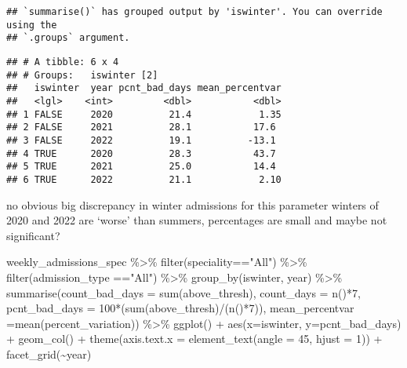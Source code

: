 \documentclass[
]{article}
\newenvironment{Shaded}{\begin{snugshade}}{\end{snugshade}}
\newcommand{\AttributeTok}[1]{\textcolor[rgb]{0.77,0.63,0.00}{#1}}
\newcommand{\DecValTok}[1]{\textcolor[rgb]{0.00,0.00,0.81}{#1}}
\newcommand{\FunctionTok}[1]{\textcolor[rgb]{0.00,0.00,0.00}{#1}}
\newcommand{\NormalTok}[1]{#1}
\newcommand{\SpecialCharTok}[1]{\textcolor[rgb]{0.00,0.00,0.00}{#1}}
\newcommand{\StringTok}[1]{\textcolor[rgb]{0.31,0.60,0.02}{#1}}
\begin{document}
\begin{verbatim}
## `summarise()` has grouped output by 'iswinter'. You can override using the
## `.groups` argument.
\end{verbatim}

\begin{verbatim}
## # A tibble: 6 x 4
## # Groups:   iswinter [2]
##   iswinter  year pcnt_bad_days mean_percentvar
##   <lgl>    <int>         <dbl>           <dbl>
## 1 FALSE     2020          21.4            1.35
## 2 FALSE     2021          28.1           17.6 
## 3 FALSE     2022          19.1          -13.1 
## 4 TRUE      2020          28.3           43.7 
## 5 TRUE      2021          25.0           14.4 
## 6 TRUE      2022          21.1            2.10
\end{verbatim}

no obvious big discrepancy in winter admissions for this parameter
winters of 2020 and 2022 are `worse' than summers, percentages are small
and maybe not significant?

\begin{Shaded}
\begin{Highlighting}[]
\NormalTok{weekly\_admissions\_spec }\SpecialCharTok{\%\textgreater{}\%} 
  \FunctionTok{filter}\NormalTok{(speciality}\SpecialCharTok{==}\StringTok{"All"}\NormalTok{) }\SpecialCharTok{\%\textgreater{}\%} 
  \FunctionTok{filter}\NormalTok{(admission\_type }\SpecialCharTok{==}\StringTok{"All"}\NormalTok{) }\SpecialCharTok{\%\textgreater{}\%} 
  \FunctionTok{group\_by}\NormalTok{(iswinter, year) }\SpecialCharTok{\%\textgreater{}\%} 
  \FunctionTok{summarise}\NormalTok{(}\AttributeTok{count\_bad\_days =} \FunctionTok{sum}\NormalTok{(above\_thresh), }
            \AttributeTok{count\_days =} \FunctionTok{n}\NormalTok{()}\SpecialCharTok{*}\DecValTok{7}\NormalTok{, }
            \AttributeTok{pcnt\_bad\_days =} \DecValTok{100}\SpecialCharTok{*}\NormalTok{(}\FunctionTok{sum}\NormalTok{(above\_thresh)}\SpecialCharTok{/}\NormalTok{(}\FunctionTok{n}\NormalTok{()}\SpecialCharTok{*}\DecValTok{7}\NormalTok{)), }
            \AttributeTok{mean\_percentvar =}\FunctionTok{mean}\NormalTok{(percent\_variation)) }\SpecialCharTok{\%\textgreater{}\%} 
  \FunctionTok{ggplot}\NormalTok{() }\SpecialCharTok{+}
  \FunctionTok{aes}\NormalTok{(}\AttributeTok{x=}\NormalTok{iswinter, }\AttributeTok{y=}\NormalTok{pcnt\_bad\_days) }\SpecialCharTok{+}
  \FunctionTok{geom\_col}\NormalTok{() }\SpecialCharTok{+}
  \FunctionTok{theme}\NormalTok{(}\AttributeTok{axis.text.x =} \FunctionTok{element\_text}\NormalTok{(}\AttributeTok{angle =} \DecValTok{45}\NormalTok{, }\AttributeTok{hjust =} \DecValTok{1}\NormalTok{)) }\SpecialCharTok{+}
  \FunctionTok{facet\_grid}\NormalTok{(}\SpecialCharTok{\textasciitilde{}}\NormalTok{year)}
\end{Highlighting}
\end{Shaded}
\end{document}
